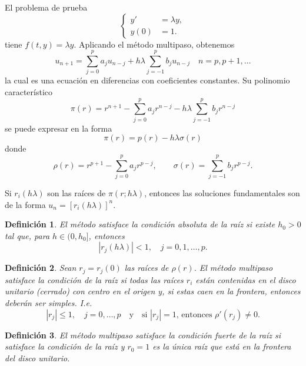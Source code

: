 \documentclass[11pt,letterpaper]{article}
\newtheorem{definition}{Definición}
\begin{document}
El problema de prueba
\begin{equation}
  \left\{
    \begin{aligned}
      y' &= \lambda y, \\
      y(0) &= 1.
    \end{aligned}
  \right.
\end{equation}
tiene $f(t,y)=\lambda y$. Aplicando el método multipaso, obtenemos
\begin{equation}
  u_{n+1}
  =
  \sum_{j=0}^{p}a_ju_{n-j}
  +
  h\lambda
  \sum_{j=-1}^{p}b_ju_{n-j}
  \quad
  n=p, p+1,\dots
\end{equation}
la cual es una ecuación en diferencias con coeficientes constantes.
Su polinomio característico
\begin{equation}
  \pi(r)
  = 
  r^{n+1}
  -
  \sum_{j=0}^{p}a_jr^{n-j}
  -
  h\lambda
  \sum_{j=-1}^{p}b_jr^{n-j}
\end{equation}
se puede expresar en la forma
\begin{equation}
  \pi(r) = p(r) - h\lambda\sigma(r)
\end{equation}
donde
\begin{equation}
  \rho(r)
  =
  r^{p+1}
  -
  \sum_{j=0}^{p}a_jr^{p-j},
  \qquad
  \sigma(r)
  =
  \sum_{j=-1}^{p}b_jr^{p-j}
.\end{equation}

Si $r_i(h\lambda)$ son las raíces de $\pi(r;h\lambda)$, entonces las
soluciones fundamentales son de la forma $u_n = [r_i(h\lambda)]^n$.

\begin{definition}
  El método satisface la \emph{condición absoluta de la raíz} si
  existe $h_0>0$ tal que, para $h\in (0,h_0]$, entonces
  \begin{equation}
    |r_j(h\lambda)|<1, \quad j=0,1,\dots,p
  .\end{equation}
\end{definition}

\begin{definition}
  Sean $r_j=r_j(0)$ las raíces de $\rho(r)$.
  El método multipaso satisface la \emph{condición de la raíz} si
  todas las
  raíces $r_i$ están contenidas en el disco unitario (cerrado) con
  centro en el origen y, si estas caen en la frontera, entonces
  deberán ser simples. I.e.
  \begin{equation}
    |r_j|\leq 1, \quad j=0,\dots,p
    \quad \text{y} \quad
    \text{si $|r_j|=1$, entonces } \rho'(r_j)\neq 0
  .\end{equation}
\end{definition}
\begin{definition}
  El método multipaso satisface la \emph{condición fuerte de la raíz}
  si satisface la condición de la raíz y $r_0=1$ es la única raíz que
  está en la frontera del disco unitario.
\end{definition}
\end{document}
